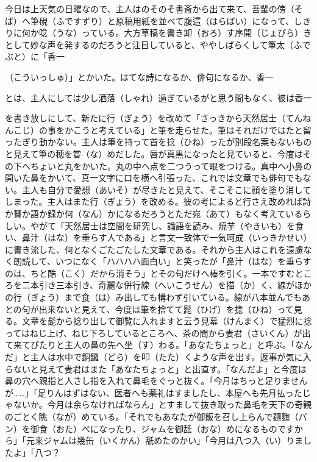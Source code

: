 \documentclass{book}
\begin{document}
今日は上天気の日曜なので、主人はのそのそ書斎から出て来て、吾輩の傍（そば）へ筆硯（ふですずり）と原稿用紙を並べて腹這（はらばい）になって、しきりに何か唸（うな）っている。大方草稿を書き卸（おろ）す序開（じょびら）きとして妙な声を発するのだろうと注目していると、ややしばらくして筆太（ふでぶと）に「香一\begin{comment}\texttt{[image: ../../../gaiji/1-87/1-87-40.png]}\end{comment}（こういっしゅ）」とかいた。はてな詩になるか、俳句になるか、香一\begin{comment}\texttt{[image: ../../../gaiji/1-87/1-87-40.png]}\end{comment}とは、主人にしては少し洒落（しゃれ）過ぎているがと思う間もなく、彼は香一\begin{comment}\texttt{[image: ../../../gaiji/1-87/1-87-40.png]}\end{comment}を書き放しにして、新たに行（ぎょう）を改めて「さっきから天然居士（てんねんこじ）の事をかこうと考えている」と筆を走らせた。筆はそれだけではたと留ったぎり動かない。主人は筆を持って首を捻（ひね）ったが別段名案もないものと見えて筆の穂を甞（な）めだした。唇が真黒になったと見ていると、今度はその下へちょいと丸をかいた。丸の中へ点を二つうって眼をつける。真中へ小鼻の開いた鼻をかいて、真一文字に口を横へ引張った、これでは文章でも俳句でもない。主人も自分で愛想（あいそ）が尽きたと見えて、そこそこに顔を塗り消してしまった。主人はまた行（ぎょう）を改める。彼の考によると行さえ改めれば詩か賛か語か録か何（なん）かになるだろうとただ宛（あて）もなく考えているらしい。やがて「天然居士は空間を研究し、論語を読み、焼芋（やきいも）を食い、鼻汁（はな）を垂らす人である」と言文一致体で一気呵成（いっきかせい）に書き流した、何となくごたごたした文章である。それから主人はこれを遠慮なく朗読して、いつになく「ハハハハ面白い」と笑ったが「鼻汁（はな）を垂らすのは、ちと酷（こく）だから消そう」とその句だけへ棒を引く。一本ですむところを二本引き三本引き、奇麗な併行線（へいこうせん）を描（か）く、線がほかの行（ぎょう）まで食（は）み出しても構わず引いている。線が八本並んでもあとの句が出来ないと見えて、今度は筆を捨てて髭（ひげ）を捻（ひね）って見る。文章を髭から捻り出して御覧に入れますと云う見幕（けんまく）で猛烈に捻ってはねじ上げ、ねじ下ろしているところへ、茶の間から妻君（さいくん）が出て来てぴたりと主人の鼻の先へ坐（す）わる。「あなたちょっと」と呼ぶ。「なんだ」と主人は水中で銅鑼（どら）を叩（たた）くような声を出す。返事が気に入らないと見えて妻君はまた「あなたちょっと」と出直す。「なんだよ」と今度は鼻の穴へ親指と人さし指を入れて鼻毛をぐっと抜く。「今月はちっと足りませんが\ldots{}\ldots{}」「足りんはずはない、医者へも薬礼はすましたし、本屋へも先月払ったじゃないか。今月は余らなければならん」とすまして抜き取った鼻毛を天下の奇観のごとく眺（なが）めている。「それでもあなたが御飯を召し上らんで麺麭（パン）を御食（おた）べになったり、ジャムを御舐（おな）めになるものですから」「元来ジャムは幾缶（いくかん）舐めたのかい」「今月は八つ入（い）りましたよ」「八つ？ 
\end{document}

